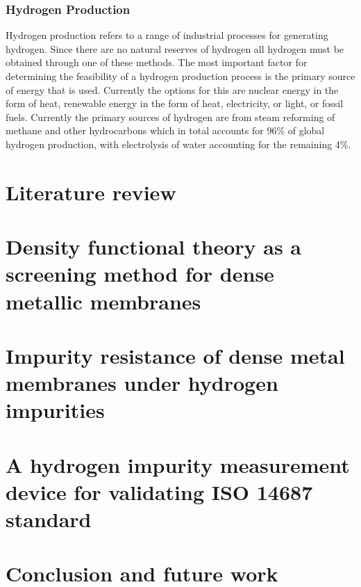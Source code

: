 \documentclass{report}
\begin{document}
\subsection{Hydrogen Production}
Hydrogen production refers to a range of industrial processes for generating hydrogen. Since there are no natural reserves of hydrogen all hydrogen must be obtained through one of these methods. The most important factor for determining the feasibility of a hydrogen production process is the primary source of energy that is used. Currently the options for this are nuclear energy in the form of heat, renewable energy in the form of heat, electricity, or light, or fossil fuels. Currently the primary sources of hydrogen are from steam reforming of methane and other hydrocarbons which in total accounts for 96\% of global hydrogen production, with electrolysis of water accounting for the remaining 4\%.


\chapter{Literature review}

\chapter{Density functional theory as a screening method for dense metallic membranes}

\chapter{Impurity resistance of dense metal membranes under hydrogen impurities}

\chapter{A hydrogen impurity measurement device for validating ISO 14687 standard}

\chapter{Conclusion and future work}
\end{document}

